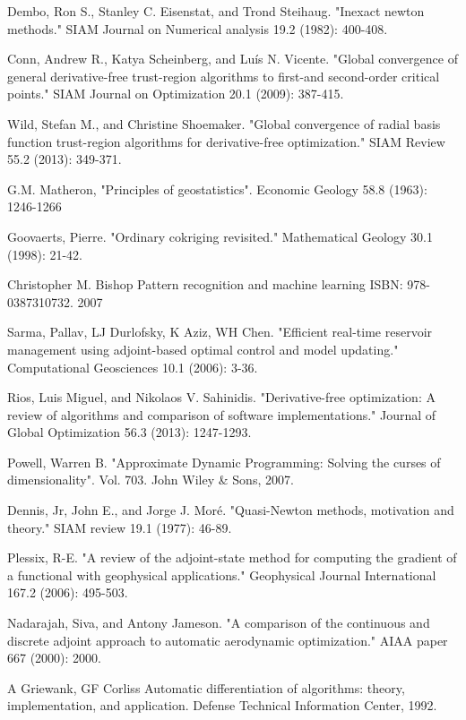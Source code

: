 \documentclass[a4paper,onecolumn]{article}
\theoremstyle{remark}
\begin{document}
\begin{thebibliography}{9}
Dembo, Ron S., Stanley C. Eisenstat, and Trond Steihaug. 
"Inexact newton methods." 
SIAM Journal on Numerical analysis 19.2 (1982): 400-408.

Conn, Andrew R., Katya Scheinberg, and Luís N. Vicente. 
"Global convergence of general derivative-free trust-region algorithms to first-and second-order critical points." 
SIAM Journal on Optimization 20.1 (2009): 387-415.

Wild, Stefan M., and Christine Shoemaker. 
"Global convergence of radial basis function trust-region algorithms for derivative-free optimization." 
SIAM Review 55.2 (2013): 349-371.

G.M. Matheron,
"Principles of geostatistics".
Economic Geology 58.8 (1963): 1246-1266

Goovaerts, Pierre. 
"Ordinary cokriging revisited." 
Mathematical Geology 30.1 (1998): 21-42.

Christopher M. Bishop
Pattern recognition and machine learning
ISBN: 978-0387310732. 2007

Sarma, Pallav, LJ Durlofsky, K Aziz, WH Chen. 
"Efficient real-time reservoir management using adjoint-based optimal control and model updating." 
Computational Geosciences 10.1 (2006): 3-36.

Rios, Luis Miguel, and Nikolaos V. Sahinidis. 
"Derivative-free optimization: A review of algorithms and comparison of software implementations." 
Journal of Global Optimization 56.3 (2013): 1247-1293.

Powell, Warren B.
"Approximate Dynamic Programming: Solving the curses of dimensionality".
Vol. 703. John Wiley \& Sons, 2007.

Dennis, Jr, John E., and Jorge J. Moré. 
"Quasi-Newton methods, motivation and theory." 
SIAM review 19.1 (1977): 46-89.

Plessix, R-E. 
"A review of the adjoint-state method for computing the gradient of a functional with geophysical applications." 
Geophysical Journal International 167.2 (2006): 495-503.

Nadarajah, Siva, and Antony Jameson. 
"A comparison of the continuous and discrete adjoint approach to automatic aerodynamic optimization." 
AIAA paper 667 (2000): 2000.

A Griewank, GF Corliss
Automatic differentiation of algorithms: theory, implementation, and application.
Defense Technical Information Center, 1992.


\end{thebibliography}
\end{document}
